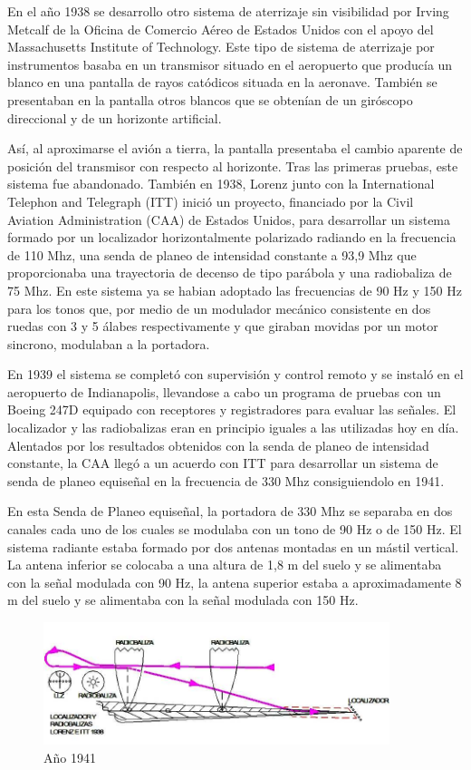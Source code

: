 En el año 1938 se desarrollo otro sistema de aterrizaje sin visibilidad por Irving Metcalf de la
Oficina de Comercio Aéreo de Estados Unidos con el apoyo del Massachusetts Institute of Technology.
Este tipo de sistema de aterrizaje por instrumentos basaba en un transmisor situado en el aeropuerto
que producía un blanco en una pantalla de rayos catódicos situada en la aeronave. También se
presentaban en la pantalla otros blancos que se obtenían de un giróscopo direccional y de un horizonte
artificial.

Así, al aproximarse el avión a tierra, la pantalla presentaba el cambio aparente de posición
del transmisor con respecto al horizonte. Tras las primeras pruebas, este sistema fue abandonado.
También en 1938, Lorenz junto con la International Telephon and Telegraph (ITT) inició un
proyecto, financiado por la Civil Aviation Administration (CAA) de Estados Unidos, para desarrollar
un sistema formado por un localizador horizontalmente polarizado radiando en la frecuencia de 110
Mhz, una senda de planeo de intensidad constante a 93,9 Mhz que proporcionaba una trayectoria de
decenso de tipo parábola y una radiobaliza de 75 Mhz. En este sistema ya se habian adoptado las
frecuencias de 90 Hz y 150 Hz para los tonos que, por medio de un modulador mecánico consistente
en dos ruedas con 3 y 5 álabes respectivamente y que giraban movidas por un motor sincrono,
modulaban a la portadora.

En 1939 el sistema se completó con supervisión y control remoto y se
instaló en el aeropuerto de Indianapolis, llevandose a cabo un programa de pruebas con un Boeing 247D equipado con receptores y registradores para evaluar las señales. El localizador y las radiobalizas
eran en principio iguales a las utilizadas hoy en día.
Alentados por los resultados obtenidos con la senda de planeo de intensidad constante, la CAA
llegó a un acuerdo con ITT para desarrollar un sistema de senda de planeo equiseñal en la frecuencia
de 330 Mhz consiguiendolo en 1941.

En esta Senda de Planeo equiseñal, la portadora de 330 Mhz se separaba en dos canales cada uno
de los cuales se modulaba con un tono de 90 Hz o de 150 Hz. El sistema radiante estaba formado por
dos antenas montadas en un mástil vertical. La antena inferior se colocaba a una altura de 1,8 m del
suelo y se alimentaba con la señal modulada con 90 Hz, la antena superior estaba a aproximadamente
8 m del suelo y se alimentaba con la señal modulada con 150 Hz.

\begin{figure}[!h]
  \centering
  \includegraphics[width = 0.9\textwidth]{06.radionavegacion/Imagenes/06.Sistemas.Aproximacion/06_1941.png}
    \caption{ Año 1941}
  \label{fig:06.ILS.1941}
\end{figure}

